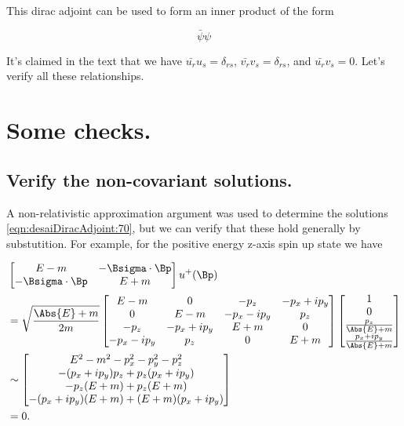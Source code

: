 This dirac adjoint can be used to form an inner product of the form

\begin{equation}\label{eqn:desaiDiracAdjoint:190}
\bar{\psi}\psi
\end{equation}

It's claimed in the text that we have $\bar{u_r} u_s = \delta_{rs}$, $\bar{v_r} v_s = \delta_{rs}$, and $\bar{u_r} v_s = 0$.  Let's verify all these relationships.

\section{Some checks.}

\subsection{Verify the non-covariant solutions.}

A non-relativistic approximation argument was used to determine the solutions \ref{eqn:desaiDiracAdjoint:70}, but we can verify that these hold generally by substutition.  For example, for the positive energy z-axis spin up state we have

\begin{align*}
&\begin{bmatrix}
E - m & - \Bsigma \cdot \Bp \\
- \Bsigma \cdot \Bp & E + m
\end{bmatrix}
u^{+}(\Bp) \\
&=
\sqrt{\frac{\Abs{E} + m}{2m}}
\begin{bmatrix}
E - m & 0 & -p_z &  -p_x + i p_y \\
0 & E - m & -p_x - i p_y & p_z \\
-p_z &  -p_x + i p_y & E + m & 0 \\
-p_x - i p_y & p_z & 0 & E + m 
\end{bmatrix}
\begin{bmatrix}
1 \\
0 \\
\frac{p_z}{\Abs{E} + m} \\
\frac{p_x + i p_y}{\Abs{E} + m} \\
\end{bmatrix} \\
&\sim 
\begin{bmatrix}
E^2 - m^2 - p_x^2 - p_y^2 - p_z^2 \\
-(p_x + i p_y) p_z + p_z (p_x + i p_y) \\
- p_z( E + m ) + p_z( E + m ) \\
-(p_x + i p_y) (E + m) + (E + m)(p_x + i p_y)
\end{bmatrix} \\
&= 0.
\end{align*}

